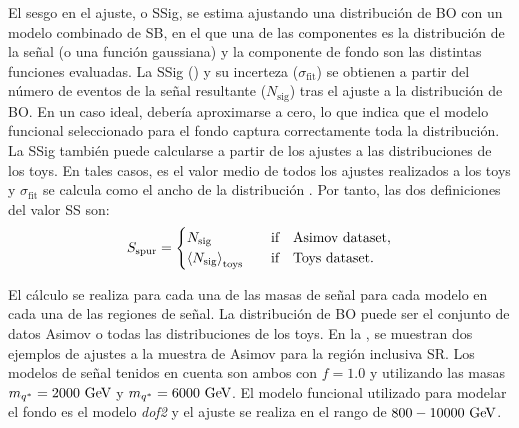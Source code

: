 El sesgo en el ajuste, o \acf{SSig}, se estima ajustando una distribución de \ac{BO} con un modelo combinado de \ac{SB}, en el que una de las componentes es la distribución de la señal (o una función gaussiana) y la componente de fondo son las distintas funciones evaluadas.
La \ac{SSig} (\sspur) y su incerteza (\(\sigma_{\text{fit}}\)) se obtienen a partir del número de eventos de la señal resultante (\(N_{\text{sig}}\)) tras el ajuste a la distribución de \ac{BO}. En un caso ideal, \sspur debería aproximarse a cero, lo que indica que el modelo funcional seleccionado para el fondo captura correctamente toda la distribución.
La \ac{SSig} también puede calcularse a partir de los ajustes a las distribuciones de los toys. En tales casos, \sspur es el valor medio de todos los ajustes realizados a los toys y \(\sigma_{\text{fit}}\) se calcula como el ancho de la distribución \sspur. Por tanto, las dos definiciones del valor \ac{SS} son:
\begin{equation}
    \label{eq:bkg:modeling:sigbkg:sstest:sspur_definition_sstest}
    \sspur = 
    \begin{cases}
        N_{\text{sig}} & \qif \text{Asimov dataset},\\
        \expval{N_{\text{sig}}}_{\text{toys}} & \qif \text{Toys dataset}.
    \end{cases}
\end{equation}

El cálculo se realiza para cada una de las masas de señal para cada modelo en cada una de las regiones de señal. La distribución de \ac{BO} puede ser el conjunto de datos Asimov o todas las distribuciones de los toys. En la \Fig{\ref{fig:bkg:modeling:sigbkg:sstest:sstest_asimov_examples}}, se muestran dos ejemplos de ajustes a la muestra de Asimov para la región inclusiva SR. Los modelos de señal tenidos en cuenta son ambos \qstar con \(f=1.0\) y utilizando las masas \(m_{q^*} = 2000~\text{GeV}\) y \(m_{q^*} = 6000~\text{GeV}\). El modelo funcional utilizado para modelar el fondo es el modelo \textit{dof2} y el ajuste se realiza en el rango \myj de \(800-10000~\text{GeV}\).


